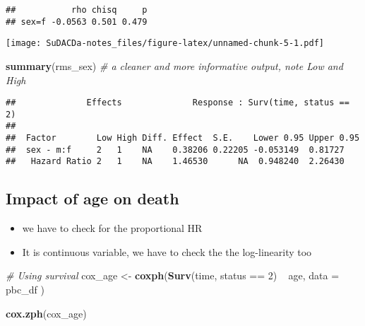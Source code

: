 \documentclass[]{book}
\newenvironment{Shaded}{\begin{snugshade}}{\end{snugshade}}
\newcommand{\KeywordTok}[1]{\textcolor[rgb]{0.13,0.29,0.53}{\textbf{{#1}}}}
\newcommand{\DataTypeTok}[1]{\textcolor[rgb]{0.13,0.29,0.53}{{#1}}}
\newcommand{\DecValTok}[1]{\textcolor[rgb]{0.00,0.00,0.81}{{#1}}}
\newcommand{\StringTok}[1]{\textcolor[rgb]{0.31,0.60,0.02}{{#1}}}
\newcommand{\CommentTok}[1]{\textcolor[rgb]{0.56,0.35,0.01}{\textit{{#1}}}}
\newcommand{\NormalTok}[1]{{#1}}
\providecommand{\tightlist}{%
  \setlength{\itemsep}{0pt}\setlength{\parskip}{0pt}}
\theoremstyle{definition}
\theoremstyle{definition}
\theoremstyle{definition}
\theoremstyle{remark}
\begin{document}
\begin{verbatim}
##           rho chisq     p
## sex=f -0.0563 0.501 0.479
\end{verbatim}

\begin{Shaded}
\end{Shaded}

\texttt{[image: SuDACDa-notes\_files/figure-latex/unnamed-chunk-5-1.pdf]}

\begin{Shaded}
\begin{Highlighting}[]
\KeywordTok{summary}\NormalTok{(rms_sex)       }\CommentTok{# a cleaner and more informative output, note Low and High}
\end{Highlighting}
\end{Shaded}

\begin{verbatim}
##              Effects              Response : Surv(time, status == 2) 
## 
##  Factor        Low High Diff. Effect  S.E.    Lower 0.95 Upper 0.95
##  sex - m:f     2   1    NA    0.38206 0.22205 -0.053149  0.81727   
##   Hazard Ratio 2   1    NA    1.46530      NA  0.948240  2.26430
\end{verbatim}

\subsection{Impact of age on death}\label{age2}

\begin{itemize}
\tightlist
\item
  we have to check for the proportional HR
\item
  It is continuous variable, we have to check the the log-linearity too
\end{itemize}

\begin{Shaded}
\begin{Highlighting}[]
\CommentTok{# Using survival}
\NormalTok{cox_age <-}\StringTok{ }\KeywordTok{coxph}\NormalTok{(}\KeywordTok{Surv}\NormalTok{(time, status ==}\StringTok{ }\DecValTok{2}\NormalTok{) ~}\StringTok{ }\NormalTok{age,}
  \DataTypeTok{data =} \NormalTok{pbc_df}
\NormalTok{)}

\KeywordTok{cox.zph}\NormalTok{(cox_age)}
\end{Highlighting}
\end{Shaded}
\end{document}
